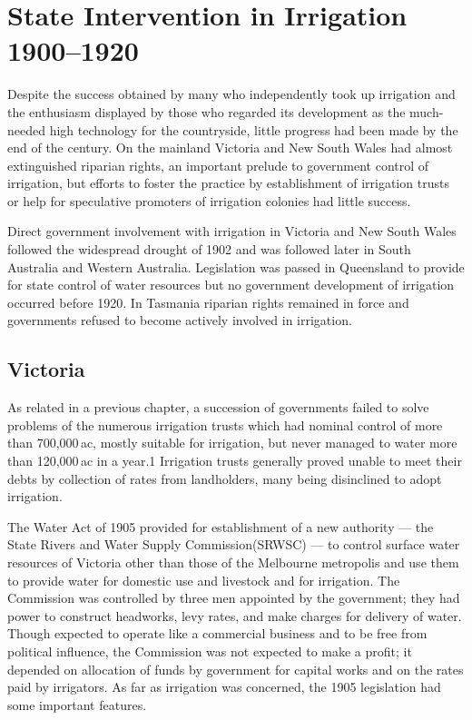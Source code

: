 
\chapter{State Intervention in Irrigation 1900--1920}

Despite the success obtained by many who independently took up
irrigation and the enthusiasm displayed by those who regarded its
development as the much-needed high technology for the countryside,
little progress had been made by the end of the century.  On the
mainland Victoria and New South Wales had almost extinguished riparian
rights, an important prelude to government control of irrigation, but
efforts to foster the practice by establishment of irrigation trusts
or help for speculative promoters of irrigation colonies had little
success.

Direct government involvement with irrigation in Victoria and New
South Wales followed the widespread drought of 1902 and was followed
later in South Australia and Western Australia.  Legislation was
passed in Queensland to provide for state control of water resources
but no government development of irrigation occurred before 1920.  In
Tasmania riparian rights remained in force and governments refused to
become actively involved in irrigation.

\section{Victoria}

As related in a previous chapter, a succession of governments failed
to solve problems of the numerous irrigation trusts which had nominal
control of more than 700,000\,ac, mostly suitable for irrigation, but
never managed to water more than 120,000\,ac in a year.1 Irrigation
trusts generally proved unable to meet their debts by collection of
rates from landholders, many being disinclined to adopt irrigation.

The Water Act of 1905 provided for establishment of a new authority
--- the State Rivers and Water Supply Commission(SRWSC) --- to control
surface water resources of Victoria other than those of the Melbourne
metropolis and use them to provide water for domestic use and
livestock and for irrigation.  The Commission was controlled by three
men appointed by the government; they had power to construct
headworks, levy rates, and make charges for delivery of water.  Though
expected to operate like a commercial business and to be free from
political influence, the Commission was not expected to make a profit;
it depended on allocation of funds by government for capital works and
on the rates paid by irrigators.  As far as irrigation was concerned,
the 1905 legislation had some important features.

